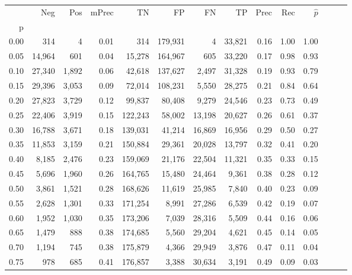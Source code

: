 \begin{tabular}{rrrrrrrrrrrrrr}
\toprule
{} &     Neg &    Pos & mPrec &       TN &       FP &      FN &      TP &  Prec &   Rec & $\hat{p}$ \\
p    &         &        &       &          &          &         &         &       &       &           \\
\midrule
0.00 &     314 &      4 &  0.01 &      314 &  179,931 &       4 &  33,821 &  0.16 &  1.00 &      1.00 \\
0.05 &  14,964 &    601 &  0.04 &   15,278 &  164,967 &     605 &  33,220 &  0.17 &  0.98 &      0.93 \\
0.10 &  27,340 &  1,892 &  0.06 &   42,618 &  137,627 &   2,497 &  31,328 &  0.19 &  0.93 &      0.79 \\
0.15 &  29,396 &  3,053 &  0.09 &   72,014 &  108,231 &   5,550 &  28,275 &  0.21 &  0.84 &      0.64 \\
0.20 &  27,823 &  3,729 &  0.12 &   99,837 &   80,408 &   9,279 &  24,546 &  0.23 &  0.73 &      0.49 \\
0.25 &  22,406 &  3,919 &  0.15 &  122,243 &   58,002 &  13,198 &  20,627 &  0.26 &  0.61 &      0.37 \\
0.30 &  16,788 &  3,671 &  0.18 &  139,031 &   41,214 &  16,869 &  16,956 &  0.29 &  0.50 &      0.27 \\
0.35 &  11,853 &  3,159 &  0.21 &  150,884 &   29,361 &  20,028 &  13,797 &  0.32 &  0.41 &      0.20 \\
0.40 &   8,185 &  2,476 &  0.23 &  159,069 &   21,176 &  22,504 &  11,321 &  0.35 &  0.33 &      0.15 \\
0.45 &   5,696 &  1,960 &  0.26 &  164,765 &   15,480 &  24,464 &   9,361 &  0.38 &  0.28 &      0.12 \\
0.50 &   3,861 &  1,521 &  0.28 &  168,626 &   11,619 &  25,985 &   7,840 &  0.40 &  0.23 &      0.09 \\
0.55 &   2,628 &  1,301 &  0.33 &  171,254 &    8,991 &  27,286 &   6,539 &  0.42 &  0.19 &      0.07 \\
0.60 &   1,952 &  1,030 &  0.35 &  173,206 &    7,039 &  28,316 &   5,509 &  0.44 &  0.16 &      0.06 \\
0.65 &   1,479 &    888 &  0.38 &  174,685 &    5,560 &  29,204 &   4,621 &  0.45 &  0.14 &      0.05 \\
0.70 &   1,194 &    745 &  0.38 &  175,879 &    4,366 &  29,949 &   3,876 &  0.47 &  0.11 &      0.04 \\
0.75 &     978 &    685 &  0.41 &  176,857 &    3,388 &  30,634 &   3,191 &  0.49 &  0.09 &      0.03 \\

\end{tabular}
